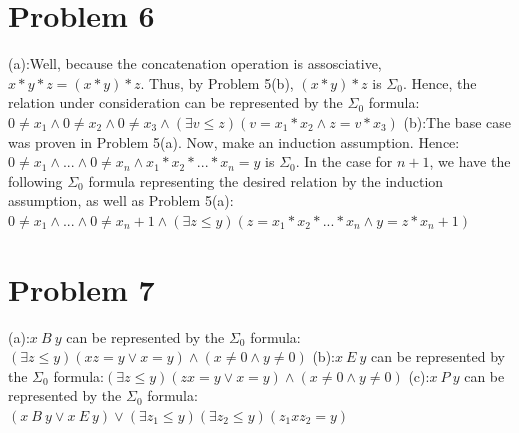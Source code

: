 \documentclass{article}
\theoremstyle{definition}
\begin{document}
\section*{Problem 6}
(a):\newline Well, because the concatenation operation is assosciative, $x*y*z=(x*y)*z$. Thus, by Problem 5(b), $(x*y)*z$ is $\Sigma_0$. Hence, the relation under consideration can be represented by the $\Sigma_0$ formula:\newline
$0\ne x_1\wedge 0\ne x_2\wedge 0\ne x_3\wedge (\exists v\le z)(v=x_1*x_2\wedge z=v*x_3)$\newline
(b):\newline The base case was proven in Problem 5(a). Now, make an induction assumption. Hence:\newline
$0\ne x_1\wedge ...\wedge 0\ne x_n\wedge x_1*x_2*...*x_n=y$ is $\Sigma_0$. In the case for $n+1$, we have the following $\Sigma_0$ formula representing 
the desired relation by the induction assumption, as well as Problem 5(a):
$0\ne x_1\wedge ...\wedge 0\ne x_n+1\wedge (\exists z\le y)(z=x_1*x_2*...*x_n\wedge y=z*x_n+1)$
\section*{Problem 7}
(a):\newline $x\ B\ y$ can be represented by the $\Sigma_0$ formula:\newline $(\exists z\le y)(xz=y\vee x=y)\wedge (x\ne 0\wedge y\ne 0)$
(b):\newline $x\ E\ y$ can be represented by the $\Sigma_0$ formula:\newline $(\exists z\le y)(zx=y\vee x=y)\wedge (x\ne 0\wedge y\ne 0)$
(c):\newline $x\ P\ y$ can be represented by the $\Sigma_0$ formula:\newline 
$(x\ B\ y\vee x\ E\ y)\vee (\exists z_1\le y)(\exists z_2\le y)(z_1xz_2=y)$ 
\end{document}
